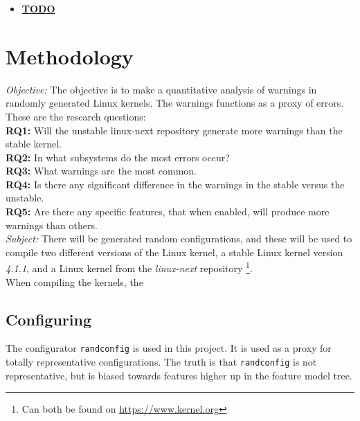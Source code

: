 \documentclass[a4paper,11pt]{report}
\begin{document}
\begin{itemize}
    \item \underline{\textbf{TODO}}
\end{itemize}


\newpage
\chapter{Methodology}

\emph{Objective:}
The objective is to make a quantitative analysis of warnings in randomly 
generated Linux kernels. The warnings functions as a proxy of errors.
These are the research questions:
\\

\textbf{RQ1:} Will the unstable linux-next repository generate more warnings 
than the stable kernel.
\\

\textbf{RQ2:} In what subsystems do the most errors occur?
\\

\textbf{RQ3:} What warnings are the most common.
\\

\textbf{RQ4:} Is there any significant difference in the warnings in the 
stable versus the unstable.
\\

\textbf{RQ5:} Are there any specific features, that when enabled, will produce 
more warnings than others. 
\\


\emph{Subject:}
There will be generated random configurations, and these will be used to 
compile two different versions of the Linux kernel, a stable Linux kernel 
version \emph{4.1.1}, and a Linux kernel from the \emph{linux-next} repository
    \footnote{Can both be found on \url{https://www.kernel.org}}.
\\

When compiling the kernels, the 



\section{Configuring}

The configurator \texttt{randconfig} is used in this project. It is used as a 
proxy for totally representative configurations. The truth is that 
\texttt{randconfig} is not representative, but is biased towards features 
higher up in the feature model tree.
\\
\end{document}

